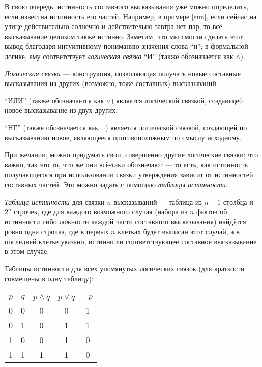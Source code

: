 В свою очередь, истинность составного высказывания уже можно определить, если
известна истинность его частей. Например, в примере \ref{sun}, если сейчас на
улице действительно солнечно и действительно завтра нет пар, то всё высказывание
целиком также истинно. Заметим, что мы смогли сделать этот вывод благодаря
интуитивному пониманию значения слова ``и''; в формальной логике, ему
соответствует \textit{логическая связка} ``И'' (также обозначается как $\land$).

\begin{defn}
  \textit{Логическая связка} --- конструкция, позволяющая получать новые
  составные высказывания из других (возможно, тоже составных) высказываний.
\end{defn}
\begin{ex}
  ``ИЛИ'' (также обозначается как $\lor$) является логической связкой, создающей
  новое высказывание из двух других.
\end{ex}
\begin{ex}
  ``НЕ'' (также обозначается как $\neg$) является логической связкой, создающей
  по высказыванию новое, являющееся противоположным по смыслу исходному.
\end{ex}

При желании, можно придумать свои, совершенно другие логические связки; что
важно, так это то, что же они всё-таки обозначают --- то есть, как истинность
получающегося при использовании связки утверждения зависит от истинностей
составных частей. Это можно задать с помощью \textit{таблицы истинности}.

\begin{defn}
  \textit{Таблица истинности} для связки $n$ высказываний --- таблица из $n+1$
  столбца и $2^n$ строчек, где для каждого возможного случая (набора из $n$
  фактов об истинности либо ложности каждой части составного высказывания)
  найдётся ровно одна строчка, где в первых $n$ клетках будет выписан этот
  случай, а в последней клетке указано, истинно ли соответствующее составное
  высказывание в этом случае.
\end{defn}

\begin{ex}
  Таблицы истинности для всех упомянутых логических связок (для краткости
  совмещены в одну таблицу):
  \begin{center}
  \begin{tabular}{cc|c|c|c}
    $p$ & $q$ & $p\land q$ & $p\lor q$ & $\neg p$ \\
    \hline
    0 & 0 & 0 & 0 & 1 \\
    0 & 1 & 0 & 1 & 1 \\
    1 & 0 & 0 & 1 & 0 \\
    1 & 1 & 1 & 1 & 0
  \end{tabular}
  \end{center}
\end{ex}

